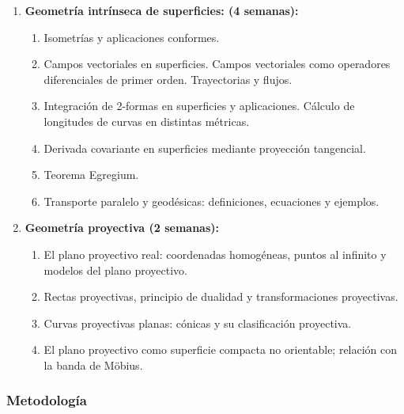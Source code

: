 \begin{refsection}
\begin{enumerate}
\item \textbf{Geometría intrínseca de superficies: (4 semanas):} 
\begin{enumerate}
      \item Isometrías y aplicaciones conformes.
      \item Campos vectoriales en superficies. Campos vectoriales como operadores diferenciales de primer orden. Trayectorias y flujos.
      \item Integración de 2-formas en superficies y aplicaciones. Cálculo de longitudes de curvas en distintas métricas.
      \item Derivada covariante en superficies mediante proyección tangencial.
      \item Teorema Egregium.
      \item Transporte paralelo y geodésicas: definiciones, ecuaciones y ejemplos.
\end{enumerate}

\item \textbf{Geometría proyectiva (2 semanas):} 
\begin{enumerate}
    \item El plano proyectivo real: coordenadas homogéneas, puntos al infinito y modelos del plano proyectivo.
    \item Rectas proyectivas, principio de dualidad y transformaciones proyectivas.
    \item Curvas proyectivas planas: cónicas y su clasificación proyectiva.
    \item El plano proyectivo como superficie compacta no orientable; relación con la banda de Möbius.
\end{enumerate}


\end{enumerate}

\subsubsection*{Metodología}


\end{refsection}
